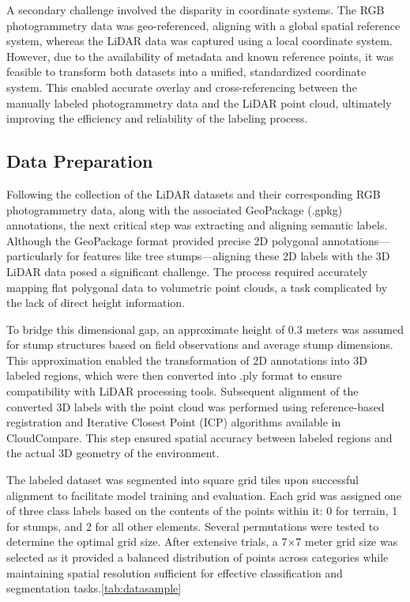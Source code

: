 \documentclass[../report.tex]{subfiles}
\begin{document}
    A secondary challenge involved the disparity in coordinate systems. The RGB photogrammetry data was geo-referenced, aligning with a global spatial reference system, whereas the LiDAR data was captured using a local coordinate system. However, due to the availability of metadata and known reference points, it was feasible to transform both datasets into a unified, standardized coordinate system. This enabled accurate overlay and cross-referencing between the manually labeled photogrammetry data and the LiDAR point cloud, ultimately improving the efficiency and reliability of the labeling process.
    
	\subsection{Data Preparation}
    Following the collection of the LiDAR datasets and their corresponding RGB photogrammetry data, along with the associated GeoPackage (.gpkg) annotations, the next critical step was extracting and aligning semantic labels. Although the GeoPackage format provided precise 2D polygonal annotations—particularly for features like tree stumps—aligning these 2D labels with the 3D LiDAR data posed a significant challenge. The process required accurately mapping flat polygonal data to volumetric point clouds, a task complicated by the lack of direct height information.

    To bridge this dimensional gap, an approximate height of 0.3 meters was assumed for stump structures based on field observations and average stump dimensions. This approximation enabled the transformation of 2D annotations into 3D labeled regions, which were then converted into .ply format to ensure compatibility with LiDAR processing tools. Subsequent alignment of the converted 3D labels with the point cloud was performed using reference-based registration and Iterative Closest Point (ICP) algorithms available in CloudCompare. This step ensured spatial accuracy between labeled regions and the actual 3D geometry of the environment.
    
    The labeled dataset was segmented into square grid tiles upon successful alignment to facilitate model training and evaluation. Each grid was assigned one of three class labels based on the contents of the points within it: 0 for terrain, 1 for stumps, and 2 for all other elements. Several permutations were tested to determine the optimal grid size. After extensive trials, a 7×7 meter grid size was selected as it provided a balanced distribution of points across categories while maintaining spatial resolution sufficient for effective classification and segmentation tasks.\ref{tab:datasample}
    
\end{document}
